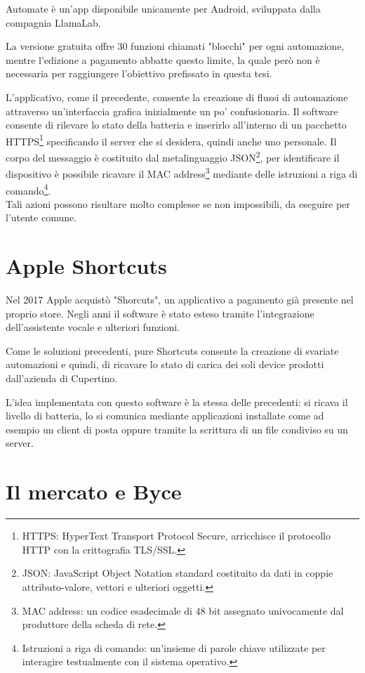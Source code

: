 \documentclass[target=bach]{thud}
\begin{document}
    Automate è un'app disponibile unicamente per Android, sviluppata dalla compagnia LlamaLab.

    La versione gratuita offre 30 funzioni chiamati "blocchi" per ogni automazione, mentre l'edizione a pagamento abbatte questo limite, la quale però non è necessaria per raggiungere l'obiettivo prefissato in questa tesi.

    L'applicativo, come il precedente, consente la creazione di flussi di automazione attraverso un'interfaccia grafica inizialmente un po' confusionaria. Il software consente di rilevare lo stato della batteria e inserirlo all'interno di un pacchetto HTTPS\footnote[2]{HTTPS: HyperText Transport Protocol Secure, arricchisce il protocollo HTTP con la crittografia TLS/SSL.} specificando il server che si desidera, quindi anche uno personale.
    Il corpo del messaggio è costituito dal metalinguaggio JSON\footnote[3]{JSON: JavaScript Object Notation standard costituito da dati in coppie attributo-valore, vettori e ulteriori oggetti.}, per identificare il dispositivo è possibile ricavare il MAC address\footnote[4]{MAC address: un codice esadecimale di 48 bit assegnato univocamente dal produttore della scheda di rete.} mediante delle istruzioni a riga di comando\footnote[5]{Istruzioni a riga di comando: un'insieme di parole chiave utilizzate per interagire testualmente con il sistema operativo.}. \\
    Tali azioni possono risultare molto complesse se non impossibili, da eseguire per l'utente comune.


    \section{Apple Shortcuts}

    Nel 2017 Apple acquistò "Shorcuts", un applicativo a pagamento già presente nel proprio store.
    Negli anni il software è stato esteso tramite l'integrazione dell'assistente vocale e ulteriori funzioni.

    Come le soluzioni precedenti, pure Shortcuts consente la creazione di svariate automazioni e quindi, di ricavare lo stato di carica dei soli device prodotti dall'azienda di Cupertino.

    L'idea implementata con questo software è la stessa delle precedenti: si ricava il livello di batteria, lo si comunica mediante applicazioni installate come ad esempio un client di posta oppure tramite la scrittura di un file condiviso su un server.

    \section{Il mercato e Byce}
\end{document}
